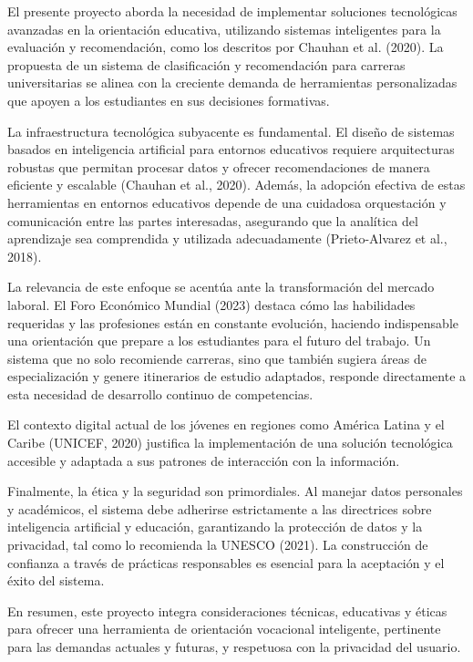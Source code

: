 El presente proyecto aborda la necesidad de implementar soluciones tecnológicas avanzadas en la orientación educativa, utilizando sistemas inteligentes para la evaluación y recomendación, como los descritos por Chauhan et al. (2020). La propuesta de un sistema de clasificación y recomendación para carreras universitarias se alinea con la creciente demanda de herramientas personalizadas que apoyen a los estudiantes en sus decisiones formativas.

La infraestructura tecnológica subyacente es fundamental. El diseño de sistemas basados en inteligencia artificial para entornos educativos requiere arquitecturas robustas que permitan procesar datos y ofrecer recomendaciones de manera eficiente y escalable (Chauhan et al., 2020). Además, la adopción efectiva de estas herramientas en entornos educativos depende de una cuidadosa orquestación y comunicación entre las partes interesadas, asegurando que la analítica del aprendizaje sea comprendida y utilizada adecuadamente (Prieto-Alvarez et al., 2018).

La relevancia de este enfoque se acentúa ante la transformación del mercado laboral. El Foro Económico Mundial (2023) destaca cómo las habilidades requeridas y las profesiones están en constante evolución, haciendo indispensable una orientación que prepare a los estudiantes para el futuro del trabajo. Un sistema que no solo recomiende carreras, sino que también sugiera áreas de especialización y genere itinerarios de estudio adaptados, responde directamente a esta necesidad de desarrollo continuo de competencias.

El contexto digital actual de los jóvenes en regiones como América Latina y el Caribe (UNICEF, 2020) justifica la implementación de una solución tecnológica accesible y adaptada a sus patrones de interacción con la información.

Finalmente, la ética y la seguridad son primordiales. Al manejar datos personales y académicos, el sistema debe adherirse estrictamente a las directrices sobre inteligencia artificial y educación, garantizando la protección de datos y la privacidad, tal como lo recomienda la UNESCO (2021). La construcción de confianza a través de prácticas responsables es esencial para la aceptación y el éxito del sistema.

En resumen, este proyecto integra consideraciones técnicas, educativas y éticas para ofrecer una herramienta de orientación vocacional inteligente, pertinente para las demandas actuales y futuras, y respetuosa con la privacidad del usuario.